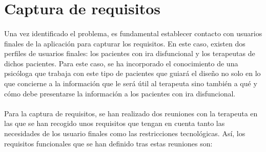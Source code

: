 \section{Captura de requisitos}
\label{sec:c4:cap}
\paragraph{}
Una vez identificado el problema, es fundamental establecer contacto con usuarios finales de la aplicación para capturar los requisitos. En este caso, existen dos perfiles de usuarios finales: los pacientes con ira disfuncional y los terapeutas de dichos pacientes. Para este caso, se ha incorporado el conocimiento de una psicóloga que trabaja con este tipo de pacientes que guiará el diseño no solo en lo que concierne a la información que le será útil al terapeuta sino también a qué y cómo debe presentarse la información a los pacientes con ira disfuncional.

\paragraph{}
Para la captura de requisitos, se han realizado dos reuniones con la terapeuta en las que se han recogido unos requisitos que tengan en cuenta tanto las necesidades de los usuario finales como las restricciones tecnológicas. Así, los requisitos funcionales que se han definido tras estas reuniones son:

